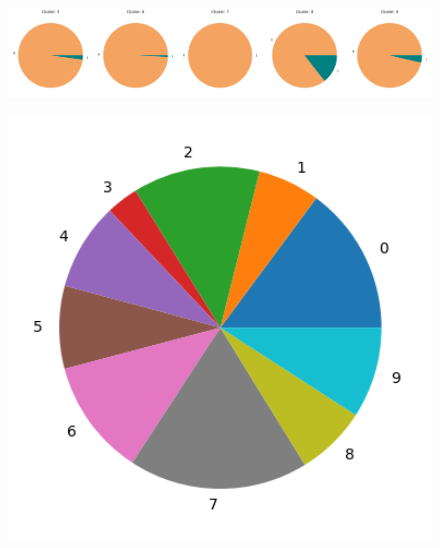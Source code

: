 \documentclass[10pt,a4paper]{report}
\begin{document}
\begin{figure}[h]
\begin{minipage}{0.75\textwidth}
		\includegraphics[width=0.2\textwidth]{xmeans_5}\includegraphics[width=0.2\textwidth]{xmeans_6}\includegraphics[width=0.2\textwidth]{xmeans_7}\includegraphics[width=0.2\textwidth]{xmeans_8}\includegraphics[width=0.2\textwidth]{xmeans_9}
	\end{minipage}%
	\begin{minipage}{0.25\textwidth}
		\centering
		\vspace{1cm}
		\includegraphics[width=1\textwidth]{xmeans_distribution}

\end{minipage}
\end{figure}
\end{document}
